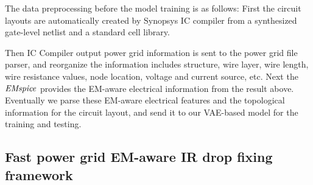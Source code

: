 
The data preprocessing before the model training is as follows:
First the circuit layouts are automatically created by Synopsys IC compiler from a synthesized gate-level netlist and a standard cell library. 

Then IC Compiler output power grid information is sent to the power grid file parser, and reorganize the information includes structure, wire layer, wire length, wire resistance values, node location, voltage and current source, etc.
Next the $\it{EMspice}$ provides the EM-aware electrical information from the result above.
Eventually we parse these EM-aware electrical features and the topological information for the circuit layout, and send it to our VAE-based model for the training and testing. 

\begin{table}[!htbp]
	\begin{center}
		\caption{Power Grid Designs Detail}
		\label{table:pg_detail}
		\center
	\end{center}
	\vspace{-0.1in}
\end{table}




\subsection{Fast power grid EM-aware IR drop fixing framework }
\label{subsec:formulation}

